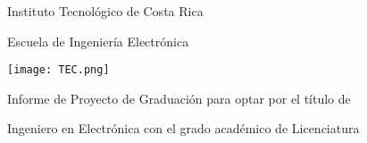 
\thispagestyle{empty} 

\begin{center}

Instituto Tecnológico de Costa Rica

\par\vspace{1ex}

Escuela de Ingeniería Electrónica

\par\vspace{20mm}

\texttt{[image: TEC.png]}

\par\vspace*{\fill}

{\large\bf{\scriptTitle}}

\par\vspace*{\fill}

Informe de Proyecto de Graduación para optar por el título de

Ingeniero en Electrónica con el grado académico de Licenciatura

\par\vspace{20mm}

\scriptAuthor

\vspace*{\fill}

\end{center}
\newpage 


